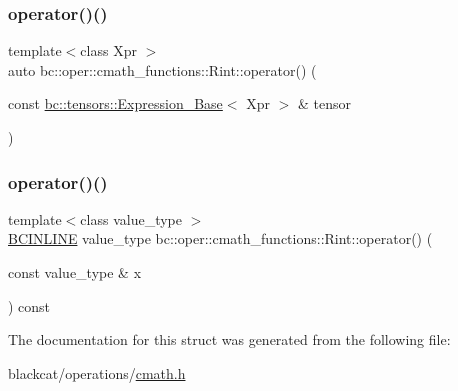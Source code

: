 \mbox{\label{structbc_1_1oper_1_1cmath__functions_1_1Rint_ab484f3bb79ce1b4573190dc84290f055}} 
\subsubsection{\texorpdfstring{operator()()}{operator()()}\hspace{0.1cm}{\footnotesize\ttfamily [2/3]}}
{\footnotesize\ttfamily template$<$class Xpr $>$ \\
auto bc\+::oper\+::cmath\+\_\+functions\+::\+Rint\+::operator() (\begin{DoxyParamCaption}\item[{const \hyperlink{classbc_1_1tensors_1_1Expression__Base}{bc\+::tensors\+::\+Expression\+\_\+\+Base}$<$ Xpr $>$ \&}]{tensor }\end{DoxyParamCaption})\hspace{0.3cm}{\ttfamily [inline]}}

\mbox{\label{structbc_1_1oper_1_1cmath__functions_1_1Rint_a90ecf752368f9d25ad47a39369078aa5}} 
\subsubsection{\texorpdfstring{operator()()}{operator()()}\hspace{0.1cm}{\footnotesize\ttfamily [3/3]}}
{\footnotesize\ttfamily template$<$class value\+\_\+type $>$ \\
\hyperlink{common_8h_a6699e8b0449da5c0fafb878e59c1d4b1}{B\+C\+I\+N\+L\+I\+NE} value\+\_\+type bc\+::oper\+::cmath\+\_\+functions\+::\+Rint\+::operator() (\begin{DoxyParamCaption}\item[{const value\+\_\+type \&}]{x }\end{DoxyParamCaption}) const\hspace{0.3cm}{\ttfamily [inline]}}



The documentation for this struct was generated from the following file\+:\begin{DoxyCompactItemize}
\item 
blackcat/operations/\hyperlink{cmath_8h}{cmath.\+h}\end{DoxyCompactItemize}
